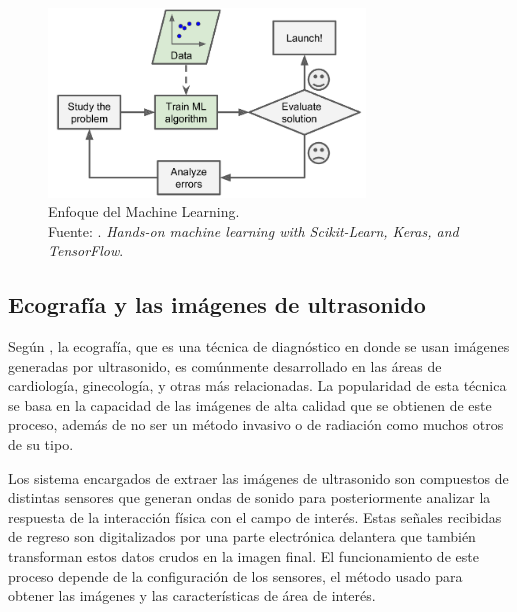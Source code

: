\begin{figure}[H]
	\begin{center}
		\includegraphics[width=0.75\textwidth]{2/figures/enfoque_ml.png}
		\caption[Enfoque del Machine Learning]{Enfoque del Machine Learning. \\
		Fuente: \cite{bk_geron2022handml}. \textit{Hands-on machine learning with Scikit-Learn, Keras, and TensorFlow}.}
		\label{2:fig209}
	\end{center}
\end{figure}

\subsection{Ecografía y las imágenes de ultrasonido}
Según \cite{pr_herrera2017diseimp}, la ecografía, que es una técnica de diagnóstico en donde se usan imágenes generadas por ultrasonido, es comúnmente desarrollado en las áreas de cardiología, ginecología, y otras más relacionadas. La popularidad de esta técnica se basa en la capacidad de las imágenes de alta calidad que se obtienen de este proceso, además de no ser un método invasivo o de radiación como muchos otros de su tipo.

Los sistema encargados de extraer las imágenes de ultrasonido son compuestos de distintas sensores que generan ondas de sonido para posteriormente analizar la respuesta de la interacción física con el campo de interés. Estas señales recibidas de regreso son digitalizados por una parte electrónica delantera que también transforman estos datos crudos en la imagen final. El funcionamiento de este proceso depende de la configuración de los sensores, el método usado para obtener las imágenes y las características de área de interés. \parencite{pr_camacho2022ultrasonicimg}

